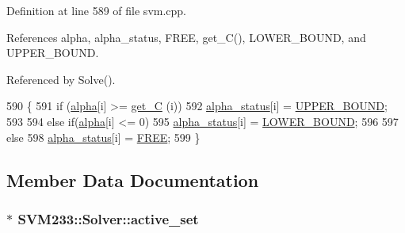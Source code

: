 Definition at line 589 of file svm.\+cpp.



References alpha, alpha\+\_\+status, F\+R\+EE, get\+\_\+\+C(), L\+O\+W\+E\+R\+\_\+\+B\+O\+U\+ND, and U\+P\+P\+E\+R\+\_\+\+B\+O\+U\+ND.



Referenced by Solve().


\begin{DoxyCode}
590     \{
591       \textcolor{keywordflow}{if}  (\hyperlink{class_s_v_m233_1_1_solver_ade1450d3dbc0633ad00958cf2b78eb0b}{alpha}[i] >= \hyperlink{class_s_v_m233_1_1_solver_a403b18fda4eb67c8a51804a23f928960}{get\_C} (i))
592         \hyperlink{class_s_v_m233_1_1_solver_a53fe33a3d4e7904b9b26343eb3942309}{alpha\_status}[i] = \hyperlink{class_s_v_m233_1_1_solver_a0aa061a12d646a89f5a9a3895984e72fa5c2ee4859d9c24409ccc71736245f617}{UPPER\_BOUND};
593   
594       \textcolor{keywordflow}{else} \textcolor{keywordflow}{if}(\hyperlink{class_s_v_m233_1_1_solver_ade1450d3dbc0633ad00958cf2b78eb0b}{alpha}[i] <= 0)
595         \hyperlink{class_s_v_m233_1_1_solver_a53fe33a3d4e7904b9b26343eb3942309}{alpha\_status}[i] = \hyperlink{class_s_v_m233_1_1_solver_a0aa061a12d646a89f5a9a3895984e72fa564c861d6783d9e64c559b7a843e9c47}{LOWER\_BOUND};
596   
597       \textcolor{keywordflow}{else} 
598         \hyperlink{class_s_v_m233_1_1_solver_a53fe33a3d4e7904b9b26343eb3942309}{alpha\_status}[i] = \hyperlink{class_s_v_m233_1_1_solver_a0aa061a12d646a89f5a9a3895984e72fac13ca8c90dd94d7ebc0325ad0896fd38}{FREE};
599     \}
\end{DoxyCode}


\subsection{Member Data Documentation}
\subsubsection[{\texorpdfstring{active\+\_\+set}{active_set}}]{$\ast$ S\+V\+M233\+::\+Solver\+::active\+\_\+set\hspace{0.3cm}{\ttfamily [protected]}}\hypertarget{class_s_v_m233_1_1_solver_a19878aa39178001e48466e2562c72360}{}\label{class_s_v_m233_1_1_solver_a19878aa39178001e48466e2562c72360}


